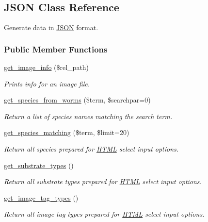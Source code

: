 \hypertarget{classJSON}{\subsection{J\-S\-O\-N Class Reference}
\label{classJSON}
}


Generate data in \hyperlink{classJSON}{J\-S\-O\-N} format.  


\subsubsection*{Public Member Functions}
\begin{DoxyCompactItemize}
\item 
\hyperlink{classJSON_a66b5ebb4e30753852638dbbf0d53e799}{get\-\_\-image\-\_\-info} (\$rel\-\_\-path)
\begin{DoxyCompactList}\small\item\em Prints info for an image file. \end{DoxyCompactList}\item 
\hyperlink{classJSON_a1f9cea49a726222ca98b6df75efbb0df}{get\-\_\-species\-\_\-from\-\_\-worms} (\$term, \$searchpar=0)
\begin{DoxyCompactList}\small\item\em Return a list of species names matching the search term. \end{DoxyCompactList}\item 
\hyperlink{classJSON_a1c6b7055dca8f87c890dd1a3dc6b4c09}{get\-\_\-species\-\_\-matching} (\$term, \$limit=20)
\begin{DoxyCompactList}\small\item\em Return all species prepared for \hyperlink{classHTML}{H\-T\-M\-L} select input options. \end{DoxyCompactList}\item 
\hyperlink{classJSON_a3dc5fecab5727b9e24af963f98ae7ed3}{get\-\_\-substrate\-\_\-types} ()
\begin{DoxyCompactList}\small\item\em Return all substrate types prepared for \hyperlink{classHTML}{H\-T\-M\-L} select input options. \end{DoxyCompactList}\item 
\hyperlink{classJSON_ae455596a746767bc1ed3805a2770be69}{get\-\_\-image\-\_\-tag\-\_\-types} ()
\begin{DoxyCompactList}\small\item\em Return all image tag types prepared for \hyperlink{classHTML}{H\-T\-M\-L} select input options. \end{DoxyCompactList}\item 

\end{DoxyCompactItemize}
